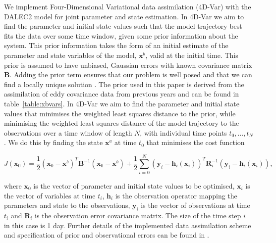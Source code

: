 \documentclass[draft,linenumbers]{agujournal}
\begin{document}
We implement Four-Dimensional Variational data assimilation (4D-Var) with the DALEC2 model for joint parameter and state estimation. In 4D-Var we aim to find the parameter and initial state values such that the model trajectory best fits the data over some time window, given some prior information about the system. This prior information takes the form of an initial estimate of the parameter and state variables of the model, $\textbf{x}^{b}$, valid at the initial time. This prior is assumed to have unbiased, Gaussian errors with known covariance matrix $\textbf{B}$. Adding the prior term ensures that our problem is well posed and that we can find a locally unique solution \citep{Tremolet2006}. The prior used in this paper is derived from the assimilation of eddy covariance data from previous years and can be found in table~\ref{table:xbvars}. In 4D-Var we aim to find the parameter and initial state values that minimises the weighted least squares distance to the prior, while minimising the weighted least squares distance of the model trajectory to the observations over a time window of length \(N\), with individual time points $t_{0}, \dots, t_{N}$ \citep{lawless2013}. We do this by finding the state $\textbf{x}^{a}$ at time $t_{0}$ that minimises the cost function

\begin{linenomath*}
\begin{equation}
J(\textbf{x}_0) = \frac{1}{2}(\textbf{x}_0-\textbf{x}^b)^{T}\textbf{B}^{-1}(\textbf{x}_0-\textbf{x}^b)+\frac{1}{2}\sum_{i=0}^{N}(\textbf{y}_i-\textbf{h}_i(\textbf{x}_i))^{T}\textbf{R}_{i}^{-1}(\textbf{y}_i-\textbf{h}_i(\textbf{x}_i)),
\end{equation}
\end{linenomath*}
where $\textbf{x}_{0}$ is the vector of parameter and initial state values to be optimised, $\textbf{x}_{i}$ is the vector of variables at time \(t_{i}\), $\textbf{h}_{i}$ is the observation operator mapping the parameters and state to the observations, $\textbf{y}_{i}$ is the vector of observations at time \(t_i\) and $\textbf{R}_{i}$ is the observation error covariance matrix. The size of the time step \(i\) in this case is 1 day. Further details of the implemented data assimilation scheme and specification of prior and observational errors can be found in \citet{Pinnington2016299}. 
\end{document}

